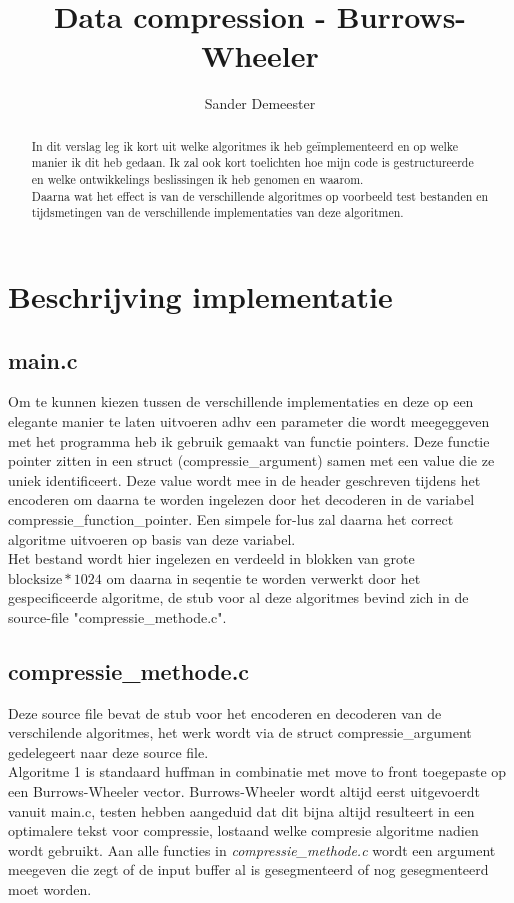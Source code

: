 \documentclass[10pt,a4paper]{report}
\author{Sander Demeester}
\title{Data compression - Burrows-Wheeler}
\begin{document}
\maketitle
\begin{abstract}
In dit verslag leg ik kort uit welke algoritmes ik heb ge\"implementeerd en op welke manier ik dit heb gedaan. Ik zal ook kort toelichten hoe mijn code is gestructureerde en welke ontwikkelings beslissingen ik heb genomen en waarom.\\

Daarna wat het effect is van de verschillende algoritmes op voorbeeld test bestanden en tijdsmetingen van de verschillende implementaties van deze algoritmen. 
\end{abstract}
\section*{Beschrijving implementatie}
\subsection*{main.c}
Om te kunnen kiezen tussen de verschillende implementaties en deze op een elegante manier te laten uitvoeren adhv een parameter die wordt meegeggeven met het programma heb ik gebruik gemaakt van functie pointers. Deze functie pointer zitten in een struct (compressie\_argument) samen met een value die ze uniek identificeert. Deze value wordt mee in de header geschreven tijdens het encoderen om daarna te worden ingelezen door het decoderen in de variabel compressie\_function\_pointer. Een simpele for-lus zal daarna het correct algoritme uitvoeren op basis van deze variabel.\\

Het bestand wordt hier ingelezen en verdeeld in blokken van grote $\text{blocksize}*1024$ om daarna in seqentie te worden verwerkt door het gespecificeerde algoritme, de stub voor al deze algoritmes bevind zich in de source-file "compressie\_methode.c".
\subsection*{compressie\_methode.c}
Deze source file bevat de stub voor het encoderen en decoderen van de verschilende algoritmes, het werk wordt via de struct compressie\_argument gedelegeert naar deze source file.\\

Algoritme 1 is standaard huffman in combinatie met move to front toegepaste op een Burrows-Wheeler vector. Burrows-Wheeler wordt altijd eerst uitgevoerdt vanuit main.c, testen hebben aangeduid dat dit bijna altijd resulteert in een optimalere tekst voor compressie, lostaand welke compresie algoritme nadien wordt gebruikt. Aan alle functies in \emph{compressie\_methode.c} wordt een argument meegeven die zegt of de input buffer al is gesegmenteerd of nog gesegmenteerd moet worden.\\
\end{document}
